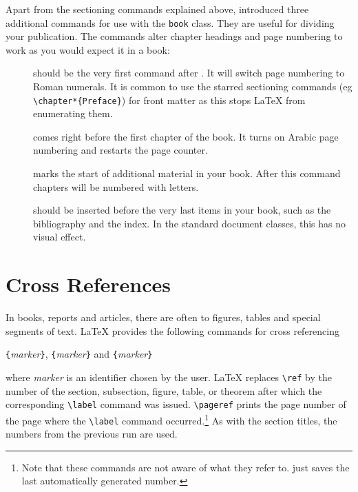 Apart from the sectioning commands explained above, \LaTeXe{}
introduced three additional commands for use with the \verb|book| class. 
They are useful for dividing your publication. The commands alter
chapter headings and page numbering to work as you would expect it in
a book:
\begin{description}
\item[] should be the very first command after
  \verb||. It will switch page numbering to Roman
    numerals. It is common to use the starred sectioning commands (eg
    \verb|\chapter*{Preface}|) for
    front matter as this stops \LaTeX{} from
    enumerating them.
\item[] comes right before the first chapter of
  the book. It turns on Arabic page numbering and restarts the page
  counter.
\item[] marks the start of additional material in your
  book. After this command chapters will be numbered with letters.
\item[] should be inserted before the very last items
  in your book, such as the bibliography and the index. In the standard
  document classes, this has no visual effect.
\end{description}


\section{Cross References}

In books, reports and articles, there are often 
 to figures, tables and special segments of text.
\LaTeX{} provides the following commands for cross referencing
\begin{lscommand}
\verb|{|\emph{marker}\verb|}|, \verb|{|\emph{marker}\verb|}| 
and \verb|{|\emph{marker}\verb|}|
\end{lscommand}
\noindent where \emph{marker} is an identifier chosen by the user. \LaTeX{}
replaces \verb|\ref| by the number of the section, subsection, figure,
table, or theorem after which the corresponding \verb|\label| command
was issued. \verb|\pageref| prints the page number of the
page where the \verb|\label| command occurred.\footnote{Note that these commands
  are not aware of what they refer to.  just saves the last
  automatically generated number.} As with the section titles, the
numbers from the previous run are used.

